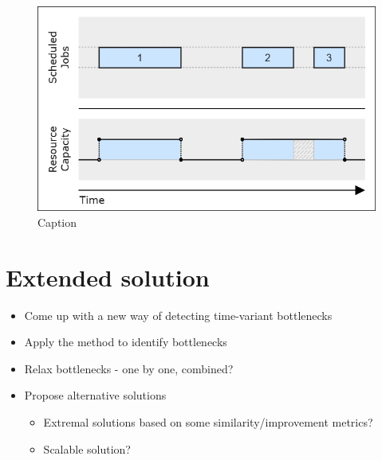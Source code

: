 \begin{figure}[p]\centering
\includegraphics[width=\textwidth]{img/Capacities-JobShop.png}
\caption{Caption}
\end{figure}

\section{Extended solution}

\begin{itemize}
    \item Come up with a new way of detecting time-variant bottlenecks
    \item Apply the method to identify bottlenecks
    \item Relax bottlenecks - one by one, combined?
    \item Propose alternative solutions
    \begin{itemize}
        \item Extremal solutions based on some similarity/improvement metrics?
        \item Scalable solution?
    \end{itemize}
\end{itemize}
